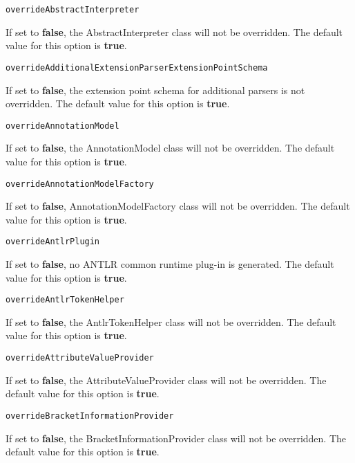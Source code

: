\noindent\texttt{overrideAbstractInterpreter}
\begin{myindentpar}{1cm}
If set to \textbf{false}, the AbstractInterpreter class will not be overridden. The default value for this option is \textbf{true}.
\end{myindentpar}

\noindent\texttt{overrideAdditionalExtensionParserExtensionPointSchema}
\begin{myindentpar}{1cm}
If set to \textbf{false}, the extension point schema for additional parsers is not overridden. The default value for this option is \textbf{true}.
\end{myindentpar}

\noindent\texttt{overrideAnnotationModel}
\begin{myindentpar}{1cm}
If set to \textbf{false}, the AnnotationModel class will not be overridden. The default value for this option is \textbf{true}.
\end{myindentpar}

\noindent\texttt{overrideAnnotationModelFactory}
\begin{myindentpar}{1cm}
If set to \textbf{false}, AnnotationModelFactory class will not be overridden. The default value for this option is \textbf{true}.
\end{myindentpar}

\noindent\texttt{overrideAntlrPlugin}
\begin{myindentpar}{1cm}
If set to \textbf{false}, no ANTLR common runtime plug-in is generated. The default value for this option is \textbf{true}.
\end{myindentpar}

\noindent\texttt{overrideAntlrTokenHelper}
\begin{myindentpar}{1cm}
If set to \textbf{false}, the AntlrTokenHelper class will not be overridden. The default value for this option is \textbf{true}.
\end{myindentpar}

\noindent\texttt{overrideAttributeValueProvider}
\begin{myindentpar}{1cm}
If set to \textbf{false}, the AttributeValueProvider class will not be overridden. The default value for this option is \textbf{true}.
\end{myindentpar}

\noindent\texttt{overrideBracketInformationProvider}
\begin{myindentpar}{1cm}
If set to \textbf{false}, the BracketInformationProvider class will not be overridden. The default value for this option is \textbf{true}.
\end{myindentpar}

